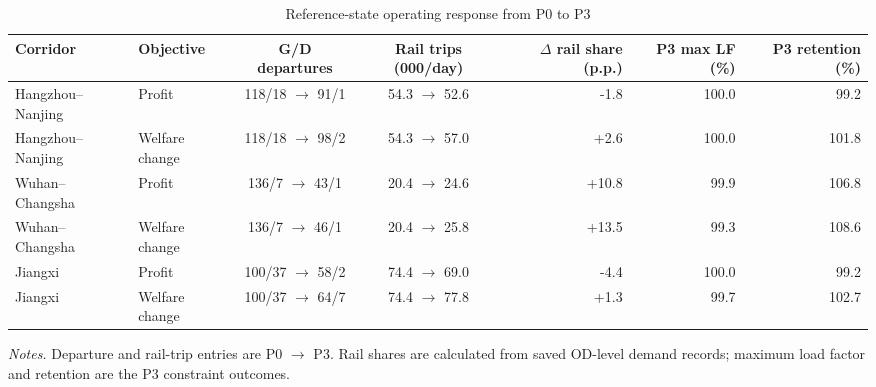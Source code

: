 \begin{table}[htbp]
\centering
\caption{Reference-state operating response from P0 to P3}\label{tab:reference_operational_outcomes}
\begingroup
\scriptsize
\setlength{\tabcolsep}{0.38em}
\renewcommand{\arraystretch}{1.08}
\begin{tabular}{@{}llccrrr@{}}
\toprule
Corridor & Objective & G/D departures & Rail trips (000/day) & $\Delta$ rail share (p.p.) & P3 max LF (\%) & P3 retention (\%) \\
\midrule
Hangzhou--Nanjing & Profit & 118/18 $\rightarrow$ 91/1 & 54.3 $\rightarrow$ 52.6 & -1.8 & 100.0 & 99.2 \\
Hangzhou--Nanjing & Welfare change & 118/18 $\rightarrow$ 98/2 & 54.3 $\rightarrow$ 57.0 & +2.6 & 100.0 & 101.8 \\
Wuhan--Changsha & Profit & 136/7 $\rightarrow$ 43/1 & 20.4 $\rightarrow$ 24.6 & +10.8 & 99.9 & 106.8 \\
Wuhan--Changsha & Welfare change & 136/7 $\rightarrow$ 46/1 & 20.4 $\rightarrow$ 25.8 & +13.5 & 99.3 & 108.6 \\
Jiangxi & Profit & 100/37 $\rightarrow$ 58/2 & 74.4 $\rightarrow$ 69.0 & -4.4 & 100.0 & 99.2 \\
Jiangxi & Welfare change & 100/37 $\rightarrow$ 64/7 & 74.4 $\rightarrow$ 77.8 & +1.3 & 99.7 & 102.7 \\
\bottomrule
\end{tabular}
\parbox{0.96\textwidth}{\footnotesize\textit{Notes.} Departure and rail-trip entries are P0 $\rightarrow$ P3. Rail shares are calculated from saved OD-level demand records; maximum load factor and retention are the P3 constraint outcomes.}
\endgroup
\end{table}
